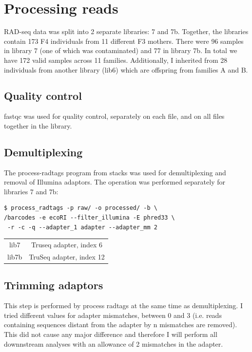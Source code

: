 \documentclass[10pt,a4paper]{report}
\begin{document}
 \chapter{Processing reads}
 RAD-seq data was split into 2 separate libraries: 7 and 7b. Together, the libraries contain 173 F4 individuals from 11 different F3 mothers. There were 96 samples in library 7 (one of which was contaminated) and 77 in library 7b. In total we have 172 valid samples across 11 families. Additionally, I inherited from 28 individuals from another library (lib6) which are offspring from families A and B.
 \section{Quality control}
 fastqc was used for quality control, separately on each file, and on all files together in the library.
 \section{Demultiplexing}
 The process-radtags program from stacks was used for demultiplexing and removal of Illumina adaptors. The operation was performed separately for libraries 7 and 7b:

\begin{lstlisting}
$ process_radtags -p raw/ -o processed/ -b \
/barcodes -e ecoRI --filter_illumina -E phred33 \
 -r -c -q --adapter_1 adapter --adapter_mm 2
\end{lstlisting}


\begin{center}
\begin{tabular}{c c}
lib7 & Truseq adapter, index 6 \footnotemark\\ 
lib7b & TruSeq adapter, index 12 \footnotemark\\
\end{tabular}
\end{center}
\section{Trimming adaptors}
This step is performed by process radtags at the same time as demultiplexing. I tried different values for adapter mismatches, between 0 and 3 (i.e. reads containing sequences distant from the adapter by n mismatches are removed). This did not cause any major difference and therefore I will perform all downnstream analyses with an allowance of 2 mismatches in the adapter.
\end{document}
